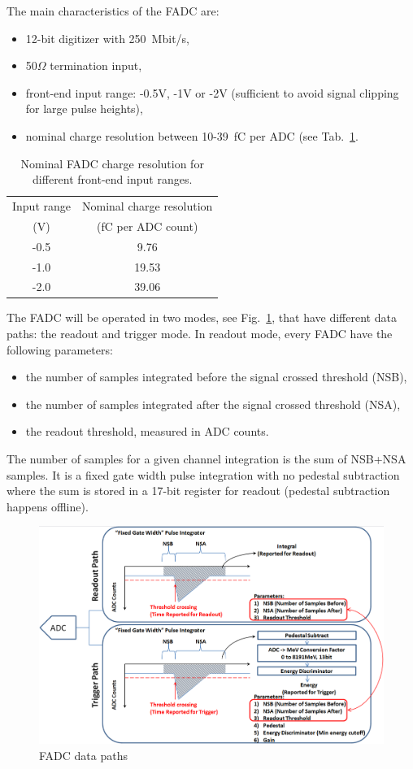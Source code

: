 The main characteristics of the FADC are:
\begin{itemize}
\item 12-bit digitizer with 250~Mbit/s, 
\item 50$\Omega$ termination input, 
\item front-end input range:  -0.5V, -1V or -2V (sufficient to avoid signal clipping for large pulse heights),
\item nominal charge resolution between 10-39~fC per ADC (see Tab.~\ref{tab:charge_resolution}.
\end{itemize}
\begin{table}[h]
\centering
\begin{tabular}{|c|c|}
\hline
Input range & Nominal charge resolution\\
(V) & (fC per ADC count)\\\hline
-0.5 & 9.76  \\\hline
-1.0 & 19.53  \\\hline
-2.0 & 39.06 \\\hline
\end{tabular}
\caption{Nominal FADC charge resolution for different front-end input ranges.}
\label{tab:charge_resolution}
\end{table}
The FADC will be operated in two modes, see Fig.~\ref{fig:hps_trigger_data}, that have different data paths:  the readout and trigger mode. 
In readout mode, every FADC have the following parameters:
 \begin{itemize}
 \item the number of samples integrated before the signal crossed threshold (NSB), 
 \item the number of samples integrated after the signal crossed threshold (NSA),
 \item the readout threshold, measured in ADC counts.
 \end{itemize}
The number of samples for a given channel integration is the sum of NSB+NSA samples. It is a fixed gate width pulse integration with no pedestal subtraction where the sum is stored in a 17-bit register for readout (pedestal subtraction happens offline). 
\begin{figure}[t]
\includegraphics[scale=0.4]{daq_trigger/figures/hps_trigger_data}
\caption{\small{FADC data paths}}
\label{fig:hps_trigger_data}
\end{figure}

